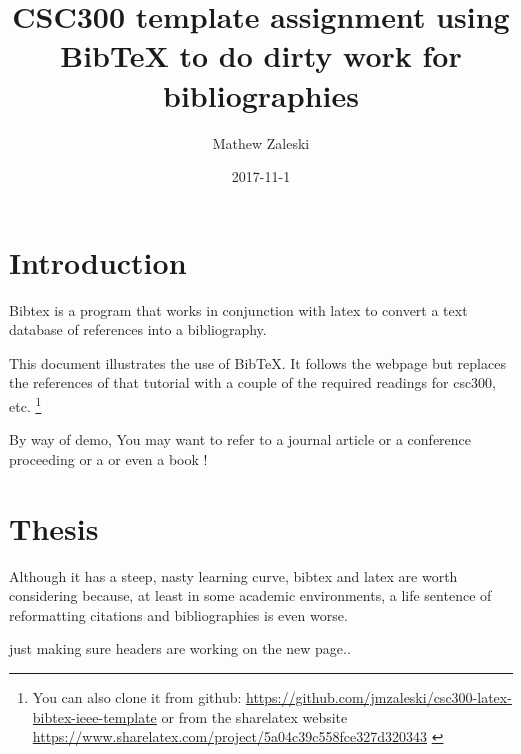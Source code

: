 \documentclass{article}
\begin{document}
\title{CSC300 template assignment using BibTeX to do dirty work for bibliographies}
\author{Mathew Zaleski}
\date{2017-11-1}

\maketitle
\thispagestyle{fancy}
\section{Introduction}

Bibtex \cite{original-bibtex,bibtex} is a program that works in
conjunction with latex to convert
a text database of references into a bibliography. 

This document illustrates the use of BibTeX\@.  It follows  the webpage
\cite{bibtex-tutorial}  but replaces the references of that tutorial
with a couple of the required readings for csc300, etc. \footnote{You can also clone it from github: \url{https://github.com/jmzaleski/csc300-latex-bibtex-ieee-template}
or from the sharelatex website \url{https://www.sharelatex.com/project/5a04c39c558fce327d320343} \cite{shared-latex-page}}


By way of demo, You may want to refer to a journal article \cite{warren-brandeis-1890}
or a conference proceeding \cite{siva05} or a \cite{gosling-interview}
or even a book \cite {java-jvm-spec}!

\section{Thesis}

Although it has a steep, nasty learning curve, bibtex and latex are
worth considering because, at least in some academic environments, a
life sentence of reformatting citations and bibliographies is even
worse.


\newpage

just making sure headers are working on the new page..




\end{document}
